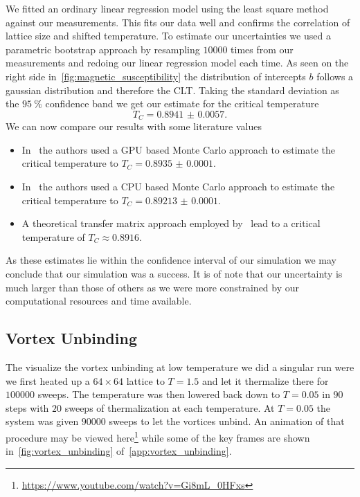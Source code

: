 We fitted an ordinary linear regression model using the least square method against our measurements. This fits our data well and confirms the correlation of lattice size and shifted temperature. To estimate our uncertainties we used a parametric bootstrap approach by resampling $\num{10 000}$ times from our measurements and redoing our linear regression model each time. As seen on the right side in~\cref{fig:magnetic_susceptibility} the distribution of intercepts $b$ follows a gaussian distribution and therefore the CLT. Taking the standard deviation as the $\SI{95}{\percent}$ confidence band we get our estimate for the critical temperature
\begin{equation}
	T_C = \num{0.8941(57)}.
\end{equation}
We can now compare our results with some literature values
\begin{itemize}
	\item In~\citet{literature_gpu} the authors used a GPU based Monte Carlo approach to estimate the critical temperature to $T_C=\num{0.8935(1)}$.
	\item In~\citet{literature_cpu} the authors used a CPU based Monte Carlo approach to estimate the critical temperature to $T_C=\num{0.89213(10)}$.
	\item A theoretical transfer matrix approach employed by~\cite{literature_theo} lead to a critical temperature of $T_C \approx \num{0.8916}$.
\end{itemize}
As these estimates lie within the confidence interval of our simulation we may conclude that our simulation was a success. It is of note that our uncertainty is much larger than those of others as we were more constrained by our computational resources and time available.

\subsection{Vortex Unbinding}\label{sec:vortex_unbinding}
The visualize the vortex unbinding at low temperature we did a singular run were we first heated up a $64 \times 64$ lattice  to $T = \num{1.5}$ and let it thermalize there for $\num{100 000}$ sweeps. The temperature was then lowered back down to $T = \num{0.05}$ in $90$ steps with $20$ sweeps of thermalization at each temperature. At $T = \num{0.05}$ the system was given $\num{90 000}$ sweeps to let the vortices unbind. An animation of that procedure may be viewed here\footnote{\url{https://www.youtube.com/watch?v=Gi8mL_0HFxs}} while some of the key frames are shown in~\cref{fig:vortex_unbinding} of~\cref{app:vortex_unbinding}.

